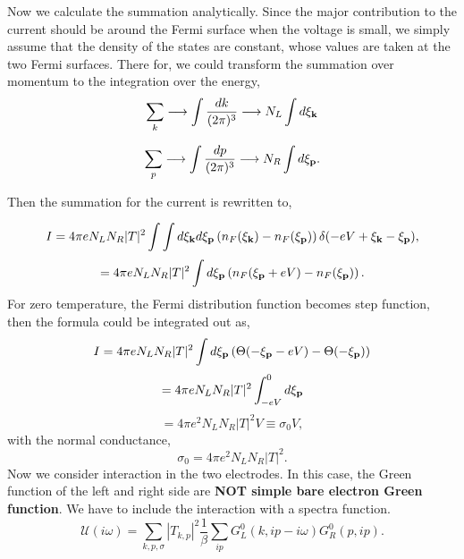 \documentclass[11pt]{article}
\begin{document}
    Now we calculate the summation analytically. Since the major
contribution to the current should be around the Fermi surface when the
voltage is small, we simply assume that the density of the states are
constant, whose values are taken at the two Fermi surfaces. There for,
we could transform the summation over momentum to the integration over
the energy, \[
\sum_{k} \longrightarrow \int \frac{dk}{(2\pi)^3} \longrightarrow  N_L \int d \xi_{\bf k}
\]

\[
\sum_{p} \longrightarrow  \int \frac{dp}{(2\pi)^3} \longrightarrow  N_R \int d \xi_{\bf p}.
\]

Then the summation for the current is rewritten to,

\[
I  = 4 \pi e N_L N_R |T|^2  \int \int  d \xi_{\bf k} d \xi_{\bf p}    \left( n_F(\xi_{\bf k})- n_F(\xi_{\bf p}) \right)  \delta(-eV   +\xi_{\bf k} -\xi_{\bf p}),
\] \[
= 4 \pi e N_L N_R |T|^2  \int d \xi_{\bf p}  \left( n_F(\xi_{\bf p} + eV)- n_F(\xi_{\bf p}) \right).
\] For zero temperature, the Fermi distribution function becomes step
function, then the formula could be integrated out as, \[
I  = 4 \pi e N_L N_R |T|^2  \int   d \xi_{\bf p}  \left( \Theta(-\xi_{\bf p} - eV) - \Theta (-\xi_{\bf p}) \right)
\] \[
= 4 \pi e N_L N_R |T|^2  \int_{-eV}^0   d \xi_{\bf p} 
\] \[
= 4 \pi e^2 N_L N_R |T|^2 V \equiv \sigma_0 V,
\] with the normal conductance, \[
 \sigma_0 =4 \pi e^2 N_L N_R |T|^2.
\] Now we consider interaction in the two electrodes. In this case, the
Green function of the left and right side are \textbf{NOT simple bare
electron Green function}. We have to include the interaction with a
spectra function. \[
\mathscr{U}(i\omega)  =\sum_{k,p,\sigma}  |T_{k,p}|^2 \frac{1}{\beta } \sum_{ip}  G^0_L(k,ip-i\omega)  G^0_R(p,ip).
\]
\end{document}
